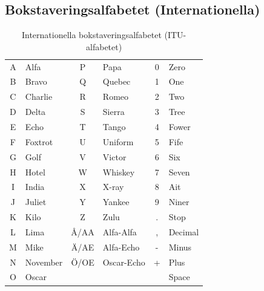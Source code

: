 \subsection{Bokstaveringsalfabetet (Internationella)}
\begin{table}[H]
\centering
\begin{tabular}{cl|cl|cl}
	A & Alfa     &  P   & Papa       & 0 & Zero    \\
	B & Bravo    &  Q   & Quebec     & 1 & One     \\
	C & Charlie  &  R   & Romeo      & 2 & Two     \\
	D & Delta    &  S   & Sierra     & 3 & Tree    \\
	E & Echo     &  T   & Tango      & 4 & Fower   \\
	F & Foxtrot  &  U   & Uniform    & 5 & Fife    \\
	G & Golf     &  V   & Victor     & 6 & Six     \\
	H & Hotel    &  W   & Whiskey    & 7 & Seven   \\
	I & India    &  X   & X-ray      & 8 & Ait     \\
	J & Juliet   &  Y   & Yankee     & 9 & Niner   \\
	K & Kilo     &  Z   & Zulu       & . & Stop    \\
	L & Lima     & Å/AA & Alfa-Alfa  & , & Decimal \\
	M & Mike     & Ä/AE & Alfa-Echo  & - & Minus   \\
	N & November & Ö/OE & Oscar-Echo & + & Plus    \\
	O & Oscar    &      &            &   & Space   \\
\end{tabular}
\caption{Internationella bokstaveringsalfabetet (ITU-alfabetet)}
\end{table}

